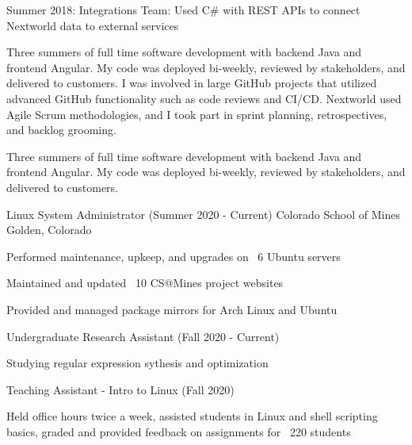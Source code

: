 \begin{cventries}
{\begin{cvitems}
    \item {Summer 2018: Integrations Team: Used C\# with REST APIs to connect Nextworld data to external services }
    \fi
      \end{cvitems}
    }
    {
      \ifcv
      \begin{cventrysummary}
        Three summers of full time software development with backend Java and frontend Angular. 
        My code was deployed bi-weekly, reviewed by stakeholders, and delivered to customers.
        I was involved in large GitHub projects that utilized advanced GitHub functionality such as code reviews and CI/CD.
        Nextworld used Agile Scrum methodologies, and I took part in sprint planning, retrospectives, and backlog grooming.
      \end{cventrysummary}
      \else
      \begin{cventrysummary}
        Three summers of full time software development with backend Java and frontend Angular.
        My code was deployed bi-weekly, reviewed by stakeholders, and delivered to customers.
      \end{cventrysummary}
      \fi
    }

    \cventry
    {Linux System Administrator (Summer 2020 - Current)}
    {Colorado School of Mines}
    {Golden, Colorado}
    {}
    {
        \begin{cvitems}
        \item Performed maintenance, upkeep, and upgrades on ~6 Ubuntu servers
        \item Maintained and updated ~10 CS@Mines project websites
        \item Provided and managed package mirrors for Arch Linux and Ubuntu
        \end{cvitems}
    }
    {}

    \vspace{-1.0mm}
    \cventry
    {Undergraduate Research Assistant (Fall 2020 - Current)}
    {}
    {}
    {}
    {
      \begin{cvitems}
        \item{Studying regular expression sythesis and optimization}
      \end{cvitems}
    }
    {}

    \vspace{-1.0mm}
    \cventry
    {Teaching Assistant - Intro to Linux (Fall 2020)}
    {}
    {}
    {}
    {
      \ifcv
        \begin{cvitems}
        \item Held office hours twice a week, assisted students in Linux and shell scripting basics, graded and provided feedback on assignments for ~220 students
        \end{cvitems}
      \fi
    }
    {}



\end{cventries}
